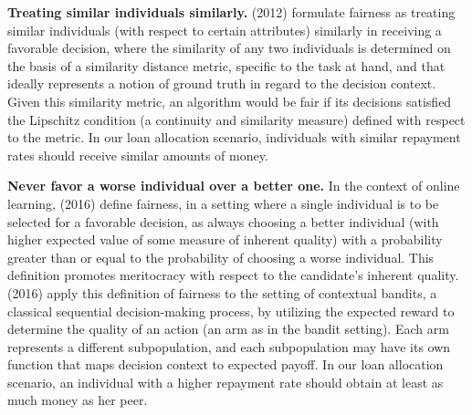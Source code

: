 \documentclass[letterpaper]{article} %
\begin{document}
\noindent
\textbf{Treating similar individuals similarly.} \citeauthor{dwork2012fairness} (2012) formulate fairness as treating similar individuals (with respect to certain attributes) similarly in receiving a favorable decision, where the similarity of any two individuals is determined on the basis of a similarity distance metric, specific to the task at hand, and that ideally represents a notion of ground truth in regard to the decision context. Given this similarity metric, an algorithm would be fair if its decisions satisfied the Lipschitz condition (a continuity and similarity measure) defined with respect to the metric. In our loan allocation scenario, individuals with similar repayment rates should receive similar amounts of money.



\noindent
\textbf{Never favor a worse individual over a better one.} In the context of online learning, \citeauthor{joseph2016fairness} (2016) define fairness, in a setting where a single individual is to be selected for a favorable decision, as always choosing a better individual (with higher expected value of some measure of inherent quality) with a probability greater than or equal to the probability of choosing a worse individual. This definition promotes meritocracy with respect to the candidate's inherent quality. \citeauthor{joseph2016fairness} (2016) apply this definition of fairness to the setting of contextual bandits, a classical sequential decision-making process, by utilizing the expected reward to determine the quality of an action (an arm as in the bandit setting). Each arm represents a different subpopulation, and each subpopulation may have its own function that maps decision context to expected payoff. In our loan allocation scenario, an individual with a higher repayment rate should obtain at least as much money as her peer. 
\end{document}
